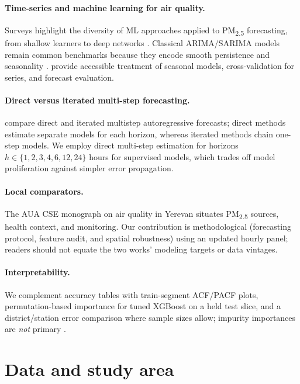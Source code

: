 \documentclass[11pt,a4paper]{article}
\begin{document}
\paragraph{Time-series and machine learning for air quality.}
Surveys highlight the diversity of ML approaches applied to PM\textsubscript{2.5} forecasting, from shallow learners to deep networks \citep{shao2020predictions}. Classical ARIMA/SARIMA models remain common benchmarks because they encode smooth persistence and seasonality \citep{box2015time}. \citet{hyndman2021forecasting} provide accessible treatment of seasonal models, cross-validation for series, and forecast evaluation.

\paragraph{Direct versus iterated multi-step forecasting.}
\citet{marcellino2006comparison} compare direct and iterated multistep autoregressive forecasts; direct methods estimate separate models for each horizon, whereas iterated methods chain one-step models. We employ direct multi-step estimation for horizons $h\in\{1,2,3,4,6,12,24\}$ hours for supervised models, which trades off model proliferation against simpler error propagation.

\paragraph{Local comparators.}
The AUA CSE monograph on air quality in Yerevan \citep{auaair2025yerevan} situates PM\textsubscript{2.5} sources, health context, and monitoring. Our contribution is methodological (forecasting protocol, feature audit, and spatial robustness) using an updated hourly panel; readers should not equate the two works' modeling targets or data vintages.

\paragraph{Interpretability.}
We complement accuracy tables with train-segment ACF/PACF plots, permutation-based importance for tuned XGBoost on a held test slice, and a district/station error comparison where sample sizes allow; impurity importances are \emph{not} primary \citep{lundberg2017unified}.

\section{Data and study area}
\label{sec:data}
\end{document}
